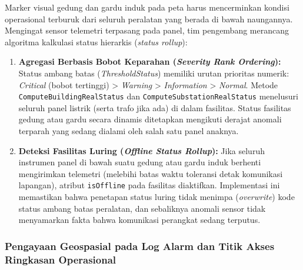 Marker visual gedung dan gardu induk pada peta harus mencerminkan kondisi operasional terburuk dari seluruh peralatan yang berada di bawah naungannya. Mengingat sensor telemetri terpasang pada panel, tim pengembang merancang algoritma kalkulasi status hierarkis (\textit{status rollup}):

\begin{enumerate}[label=\arabic*., leftmargin=*, itemsep=0pt]
  \item \textbf{Agregasi Berbasis Bobot Keparahan (\textit{Severity Rank Ordering}):} Status ambang batas (\textit{ThresholdStatus}) memiliki urutan prioritas numerik: \textit{Critical} (bobot tertinggi) > \textit{Warning} > \textit{Information} > \textit{Normal}. Metode \texttt{ComputeBuildingRealStatus} dan \texttt{ComputeSubstationRealStatus} menelusuri seluruh panel listrik (serta trafo jika ada) di dalam fasilitas. Status fasilitas gedung atau gardu secara dinamis ditetapkan mengikuti derajat anomali terparah yang sedang dialami oleh salah satu panel anaknya.
  \item \textbf{Deteksi Fasilitas Luring (\textit{Offline Status Rollup}):} Jika seluruh instrumen panel di bawah suatu gedung atau gardu induk berhenti mengirimkan telemetri (melebihi batas waktu toleransi detak komunikasi lapangan), atribut \texttt{isOffline} pada fasilitas diaktifkan. Implementasi ini memastikan bahwa penetapan status luring tidak menimpa (\textit{overwrite}) kode status ambang batas peralatan, dan sebaliknya anomali sensor tidak menyamarkan fakta bahwa komunikasi perangkat sedang terputus.
\end{enumerate}

\subsubsection{Pengayaan Geospasial pada Log Alarm dan Titik Akses Ringkasan Operasional}

